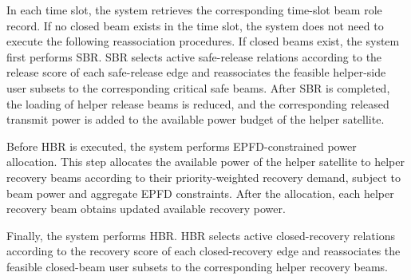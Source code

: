 In each time slot, the system retrieves the corresponding time-slot beam role record. If no closed beam exists in the time slot, the system does not need to execute the following reassociation procedures. If closed beams exist, the system first performs SBR. SBR selects active safe-release relations according to the release score of each safe-release edge and reassociates the feasible helper-side user subsets to the corresponding critical safe beams. After SBR is completed, the loading of helper release beams is reduced, and the corresponding released transmit power is added to the available power budget of the helper satellite.

Before HBR is executed, the system performs EPFD-constrained power allocation. This step allocates the available power of the helper satellite to helper recovery beams according to their priority-weighted recovery demand, subject to beam power and aggregate EPFD constraints. After the allocation, each helper recovery beam obtains updated available recovery power.

Finally, the system performs HBR. HBR selects active closed-recovery relations according to the recovery score of each closed-recovery edge and reassociates the feasible closed-beam user subsets to the corresponding helper recovery beams.

